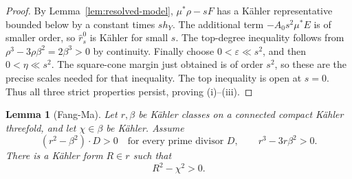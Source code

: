 \documentclass[reqno]{amsart}
\theoremstyle{remark}
\theoremstyle{plain}
\newtheorem{lemma}[thm]{Lemma}
\begin{document}
\begin{proof}
By Lemma~\ref{lem:resolved-model},
$\mu^*\rho-sF$ has a K\"ahler representative bounded below by a
constant times $s h_Y$.  The additional term
$-A_0s^2\mu^*E$ is of smaller order, so
$\widehat r_s^0$ is K\"ahler for small $s$.
The top-degree inequality follows from $\rho^3-3\rho\beta^2=2\beta^3>0$ by
continuity.  Finally choose $0<\varepsilon\ll s^2$, and then
$0<\eta\ll s^2$.  The square-cone margin just obtained is of order
$s^2$, so these are the precise scales needed for that inequality.  The top inequality is open at $s=0$.  Thus all three
strict properties persist, proving (i)--(iii).
\end{proof}


\begin{lemma}[Fang-Ma]
    Let $r,\beta$ be K\"ahler classes on a connected compact K\"ahler
threefold, and let $\chi\in\beta$ be K\"ahler.  Assume
\[
 (r^2-\beta^2)\cdot D>0
 \quad\text{for every prime divisor }D,
 \qquad
 r^3-3r\beta^2>0.
\]
There is a K\"ahler form $R\in r$ such that
\[
 R^2-\chi^2>0.
\]
\end{lemma}
\end{document}
